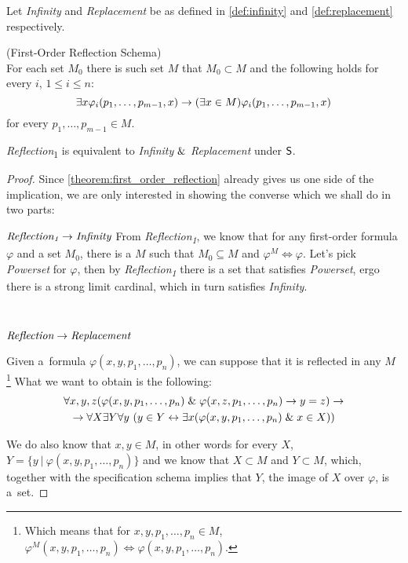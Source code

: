 Let \emph{Infinity} and \emph{Replacement} be as defined in \ref{def:infinity} and \ref{def:replacement} respectively.

\begin{definition}{(First-Order Reflection Schema)}\\
For each set $M_0$ there is such set $M$ that $M_0 \subset M$ and the following holds for every $i$, $1 \leq i \leq n$:
\begin{equation}\label{equation:refl_lemma_i}
\exists x \varphi_i(p_1, \ldots, p_{m-1}, x) \rightarrow (\exists x \in M) \varphi_i(p_1, \ldots, p_{m-1}, x)
\end{equation}
for every $p_1, \ldots, p_{m-1} \in M$.
\end{definition}

\begin{theorem}\label{theorem:levy_equivalence_contemporary}
\emph{Reflection}\textsubscript{1} is equivalent to \emph{Infinity} $ \mathrel{\&} $ \emph{Replacement} under $\sf{S}$.
\end{theorem}
\begin{proof}
Since \ref{theorem:first_order_reflection} already gives us one side of the implication, we are only interested in showing the converse which we shall do in two parts:

$\bold{\emph{Reflection\textsubscript{1}} \rightarrow \emph{Infinity}}$
From \emph{Reflection\textsubscript{1}}, we know that for any first-order formula $\varphi$ and a set $M_0$, there is a $M$ such that $M_0 \subseteq M$ and $\varphi^M \iff \varphi$. Let's pick \emph{Powerset} for $\varphi$, then by \emph{Reflection\textsubscript{1}} there is a set that satisfies \emph{Powerset}, ergo there is a strong limit cardinal, which in turn satisfies \emph{Infinity}.

\

$\bold{\emph{Reflection} \rightarrow \emph{Replacement}}$

Given a~formula $\varphi(x, y, p_1, \ldots, p_n)$, we can suppose that it is reflected in any $M$ \footnote{Which means that for $x, y, p_1, \ldots, p_n \in M$, $\varphi^M(x, y, p_1, \ldots, p_n) \iff \varphi(x, y, p_1, \ldots, p_n)$.}
What we want to obtain is the following:
\begin{equation}
\begin{gathered}
\forall x, y, z (\varphi(x, y, p_1, \ldots, p_n) \mathrel{\&} \varphi(x, z, p_1, \ldots, p_n) \rightarrow y = z) \rightarrow\\
\rightarrow \forall X \exists Y \forall y\ (y \in Y \leftrightarrow \exists x (\varphi(x, y, p_1, \ldots, p_n) \mathrel{\&} x \in X ))
\end{gathered}
\end{equation}

We do also know that $x, y \in M$, in other words for every $X$, $Y = \{y\ |\ \varphi(x, y, p_1, \ldots, p_n)\}$ and we know that $X \subset M$ and $Y \subset M$, which, together with the specification schema implies that $Y$, the image of $X$ over $\varphi$, is a~set.
\end{proof}

